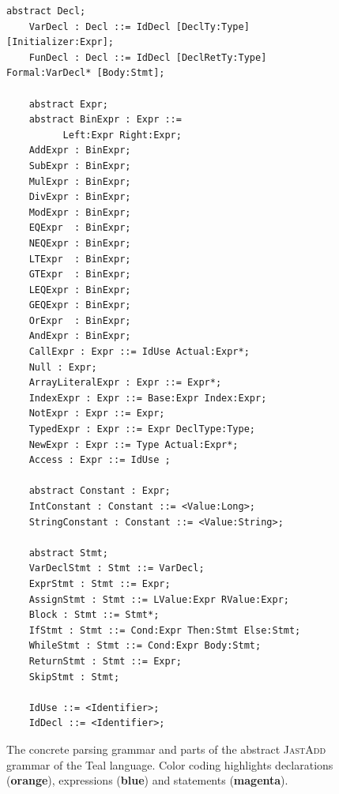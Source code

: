 \begin{figure}[H]
\begin{minipage}{0.8\textwidth}
\begin{lrbox}{\mylistingbox}
\begin{lstlisting}[language=ASTGrammar]
    abstract Decl;
    VarDecl : Decl ::= IdDecl [DeclTy:Type] [Initializer:Expr];
    FunDecl : Decl ::= IdDecl [DeclRetTy:Type] Formal:VarDecl* [Body:Stmt];

    abstract Expr;
    abstract BinExpr : Expr ::= 
          Left:Expr Right:Expr;
    AddExpr : BinExpr;
    SubExpr : BinExpr;
    MulExpr : BinExpr;
    DivExpr : BinExpr;
    ModExpr : BinExpr;
    EQExpr  : BinExpr;
    NEQExpr : BinExpr;
    LTExpr  : BinExpr;
    GTExpr  : BinExpr;
    LEQExpr : BinExpr;
    GEQExpr : BinExpr;
    OrExpr  : BinExpr;
    AndExpr : BinExpr;
    CallExpr : Expr ::= IdUse Actual:Expr*;
    Null : Expr;
    ArrayLiteralExpr : Expr ::= Expr*;
    IndexExpr : Expr ::= Base:Expr Index:Expr;
    NotExpr : Expr ::= Expr;
    TypedExpr : Expr ::= Expr DeclType:Type;
    NewExpr : Expr ::= Type Actual:Expr*;
    Access : Expr ::= IdUse ;

    abstract Constant : Expr;
    IntConstant : Constant ::= <Value:Long>;
    StringConstant : Constant ::= <Value:String>;

    abstract Stmt;
    VarDeclStmt : Stmt ::= VarDecl;
    ExprStmt : Stmt ::= Expr;
    AssignStmt : Stmt ::= LValue:Expr RValue:Expr;
    Block : Stmt ::= Stmt*;
    IfStmt : Stmt ::= Cond:Expr Then:Stmt Else:Stmt;
    WhileStmt : Stmt ::= Cond:Expr Body:Stmt;
    ReturnStmt : Stmt ::= Expr;
    SkipStmt : Stmt;

    IdUse ::= <Identifier>;
    IdDecl ::= <Identifier>;
        \end{lstlisting}
\end{lrbox}
\scalebox{0.75}{\usebox{\mylistingbox}}

        \end{minipage}
\caption{\label{fig:tealGrammar} The concrete parsing grammar and parts of the abstract \textsc{JastAdd} grammar of the Teal language. 
 Color coding highlights declarations ({\bfseries\color{orange}orange}), expressions ({\bfseries\color{lightblue}blue}) and statements ({\bfseries\color{magenta}magenta}).}
\end{figure}

